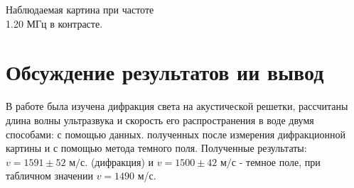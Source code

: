 \documentclass{article}
\begin{document}
\begin{enumerate}
\begin{minipage}{0.47\textwidth}
\begin{center}
	Наблюдаемая картина при частоте\\ 1.20 МГц в контрасте.
\end{center}
\end{minipage}


\end{enumerate}
\section{Обсуждение результатов ии вывод}
В работе была изучена дифракция света на акустической решетки, рассчитаны длина волны ультразвука и скорость его распространения в воде двумя способами: с помощью данных. полученных после измерения дифракционной картины и с помощью метода темного поля. Полученные результаты: $v=1591\pm52\text{ м/с}.$ (дифракция) и  $v = 1500 \pm 42 \text{ м/с} $ - темное поле, при табличном значении  $v=1490$ м/с.
\end{document}
